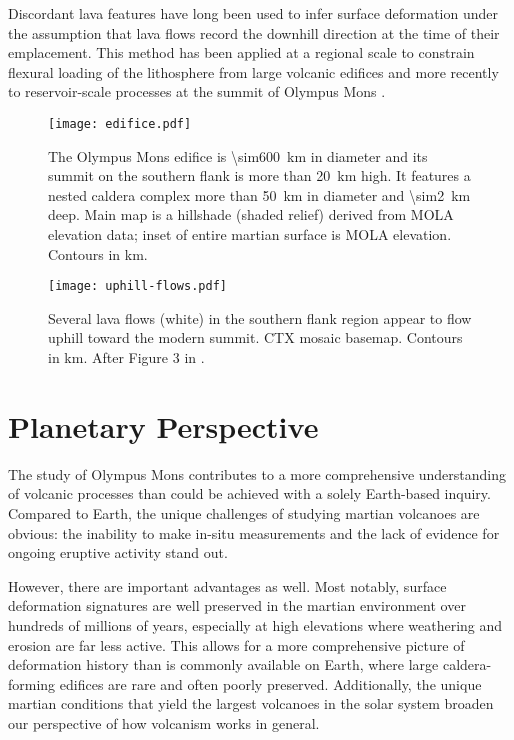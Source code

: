 Discordant lava features have long been used to infer surface deformation under the assumption that lava flows record the downhill direction at the time of their emplacement. This method has been applied at a regional scale to constrain flexural loading of the lithosphere from large volcanic edifices \parencite{mouginis-mark_ancient_1982,isherwood_volcanic_2013,chadwick_late_2015} and more recently to reservoir-scale processes at the summit of Olympus Mons \parencite{mouginis-mark_late-stage_2019}.

\begin{figure}
    \centering
    \texttt{[image: edifice.pdf]}
    \caption[Olympus Mons]{The Olympus Mons edifice is \qty{\sim600}{\km} in diameter and its summit on the southern flank is more than \qty{20}{\km} high. It features a nested caldera complex more than \qty{50}{\km} in diameter and \qty{\sim2}{\km} deep. Main map is a hillshade (shaded relief) derived from \acs{MOLA} elevation data; inset of entire martian surface is \acs{MOLA} elevation. Contours in \unit{\km}.}\label{fig:edifice}
\end{figure}

\begin{figure}
    \centering
    \texttt{[image: uphill-flows.pdf]}
    \caption[Discordant lava flows]{Several lava flows (white) in the southern flank region appear to flow uphill toward the modern summit. \acs{CTX} mosaic basemap. Contours in \unit{\km}. After Figure 3 in \textcite{mouginis-mark_late-stage_2019}.}%
    \label{fig:uphill-flows}
\end{figure}

\section{Planetary Perspective}

The study of Olympus Mons contributes to a more comprehensive understanding of volcanic processes than could be achieved with a solely Earth-based inquiry. Compared to Earth, the unique challenges of studying martian volcanoes are obvious: the inability to make in-situ measurements and the lack of evidence for ongoing eruptive activity stand out. 

However, there are important advantages as well. Most notably, surface deformation signatures are well preserved in the martian environment over hundreds of millions of years, especially at high elevations where weathering and erosion are far less active. This allows for a more comprehensive picture of deformation history than is commonly available on Earth, where large caldera-forming edifices are rare and often poorly preserved. Additionally, the unique martian conditions that yield the largest volcanoes in the solar system broaden our perspective of how volcanism works in general.

